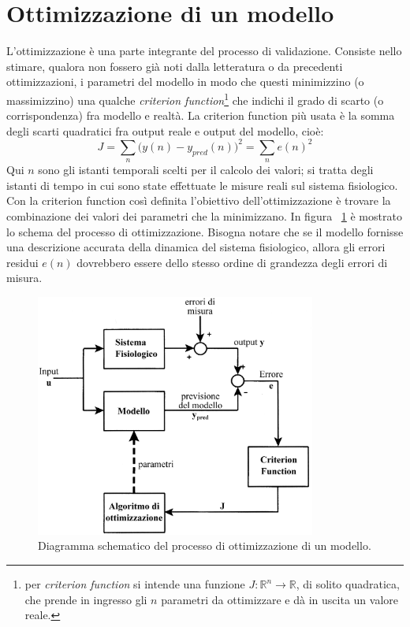 \section{Ottimizzazione di un modello}\label{sec:simplex}
L'ottimizzazione è una parte integrante del processo di validazione. Consiste nello stimare, qualora non fossero già noti dalla letteratura o da precedenti ottimizzazioni, i parametri del modello in modo che questi minimizzino (o massimizzino) una qualche \textit{criterion function}\footnote{per \textit{criterion function} si intende una funzione $J:\mathbb{R}^n\rightarrow \mathbb{R}$, di solito quadratica, che prende in ingresso gli $n$ parametri da ottimizzare e dà in uscita un valore reale.} che indichi il grado di scarto (o corrispondenza) fra modello e realtà. La criterion function più usata è la somma degli scarti quadratici fra output reale e output del modello, cioè:
$$J = \sum_n\bigl(y(n)-y_{pred}(n)\bigr)^2 = \sum_n e(n)^2$$
Qui $n$ sono gli istanti temporali scelti per il calcolo dei valori; si tratta degli istanti di tempo in cui sono state effettuate le misure reali sul sistema fisiologico. Con la criterion function così definita l'obiettivo dell'ottimizzazione è trovare la combinazione dei valori dei parametri che la minimizzano. In figura \figurename~\ref{opt_scheme} è mostrato lo schema del processo di ottimizzazione. Bisogna notare che se il modello fornisse una descrizione accurata della dinamica del sistema fisiologico, allora gli errori residui $e(n)$ dovrebbero essere dello stesso ordine di grandezza degli errori di misura.
\begin{figure}[htb]
	\centering
	\includegraphics[width=0.82\textwidth]{immagini/opt_scheme.eps}
	\caption{Diagramma schematico del processo di ottimizzazione di un modello.}\label{opt_scheme}		
\end{figure}
